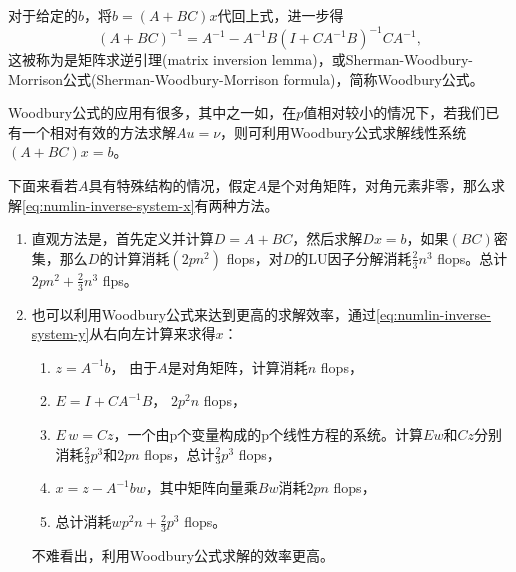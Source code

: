 对于给定的$b$，将$b = \left(A + B C \right) x$代回上式，进一步得
\begin{equation}
  \label{eq:matrix-inversion-woodbury-matrix-identity}
  \left( A + BC \right)^{-1}  = A^{-1} - A^{-1} B
  \left( I + C A^{-1} B \right)^{-1}
  C A^{-1},
\end{equation}
这被称为是矩阵求逆引理(matrix inversion lemma)，或Sherman-Woodbury-Morrison公式(Sherman-Woodbury-Morrison formula)，简称Woodbury公式。

Woodbury公式的应用有很多，其中之一如，在$p$值相对较小的情况下，若我们已有一个相对有效的方法求解$A u = \nu$，则可利用Woodbury公式求解线性系统$\left( A + BC \right) x = b$。

下面来看若$A$具有特殊结构的情况，假定$A$是个对角矩阵，对角元素非零，那么求解\eqref{eq:numlin-inverse-system-x}有两种方法。
\begin{enumerate}
  \item 直观方法是，首先定义并计算$D = A + B C$，然后求解$D x = b$，如果$\left( B C \right)$密集，那么$D$的计算消耗$\left( 2 p n^{2} \right)$ flops，对$D$的LU因子分解消耗$\frac{2}{3} n^{3}$ flops。总计$2 p n^{2} + \frac{2}{3} n^{3}$ flps。
  \item 也可以利用Woodbury公式来达到更高的求解效率，通过\eqref{eq:numlin-inverse-system-y}从右向左计算来求得$x$：
  \begin{enumerate}
    \item $z= A^{-1} b $， 由于$A$是对角矩阵，计算消耗$n$ flops，
    \item $E = I + C A^{-1} B$， $2 p^{2} n$ flops，
    \item $E \, w = C z$，一个由p个变量构成的p个线性方程的系统。计算$E w$和$C z$分别消耗$\frac{2}{3} p^{3}$和$2 p n$ flops，总计$\frac{2}{3} p^{3}$ flops，
    \item $x = z - A^{-1} b w$，其中矩阵向量乘$Bw$消耗$2 pn$ flops，
    \item 总计消耗$w p^{2} n + \frac{2}{3} p^{3}$ flops。
  \end{enumerate}

  不难看出，利用Woodbury公式求解的效率更高。
\end{enumerate}

